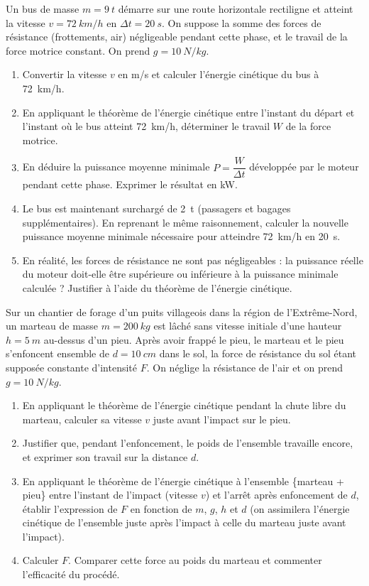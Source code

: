 \documentclass[11pt]{article}
\begin{document}
\begin{exercice}
Un bus de masse $m = \SI{9}{t}$ démarre sur une route horizontale rectiligne et atteint la vitesse $v = \SI{72}{km/h}$ en $\Delta t = \SI{20}{s}$. On suppose la somme des forces de résistance (frottements, air) négligeable pendant cette phase, et le travail de la force motrice constant. On prend $g = \SI{10}{N/kg}$.
\begin{enumerate}
\item Convertir la vitesse $v$ en m/s et calculer l'énergie cinétique du bus à \SI{72}{km/h}.
\item En appliquant le théorème de l'énergie cinétique entre l'instant du départ et l'instant où le bus atteint \SI{72}{km/h}, déterminer le travail $W$ de la force motrice.
\item En déduire la puissance moyenne minimale $P = \dfrac{W}{\Delta t}$ développée par le moteur pendant cette phase. Exprimer le résultat en kW.
\item Le bus est maintenant surchargé de \SI{2}{t} (passagers et bagages supplémentaires). En reprenant le même raisonnement, calculer la nouvelle puissance moyenne minimale nécessaire pour atteindre \SI{72}{km/h} en \SI{20}{s}.
\item En réalité, les forces de résistance ne sont pas négligeables : la puissance réelle du moteur doit-elle être supérieure ou inférieure à la puissance minimale calculée ? Justifier à l'aide du théorème de l'énergie cinétique.
\end{enumerate}
\end{exercice}

\begin{exercice}
Sur un chantier de forage d'un puits villageois dans la région de l'Extrême-Nord, un marteau de masse $m = \SI{200}{kg}$ est lâché sans vitesse initiale d'une hauteur $h = \SI{5}{m}$ au-dessus d'un pieu. Après avoir frappé le pieu, le marteau et le pieu s'enfoncent ensemble de $d = \SI{10}{cm}$ dans le sol, la force de résistance du sol étant supposée constante d'intensité $F$. On néglige la résistance de l'air et on prend $g = \SI{10}{N/kg}$.
\begin{enumerate}
\item En appliquant le théorème de l'énergie cinétique pendant la chute libre du marteau, calculer sa vitesse $v$ juste avant l'impact sur le pieu.
\item Justifier que, pendant l'enfoncement, le poids de l'ensemble travaille encore, et exprimer son travail sur la distance $d$.
\item En appliquant le théorème de l'énergie cinétique à l'ensemble \{marteau + pieu\} entre l'instant de l'impact (vitesse $v$) et l'arrêt après enfoncement de $d$, établir l'expression de $F$ en fonction de $m$, $g$, $h$ et $d$ (on assimilera l'énergie cinétique de l'ensemble juste après l'impact à celle du marteau juste avant l'impact).
\item Calculer $F$. Comparer cette force au poids du marteau et commenter l'efficacité du procédé.
\end{enumerate}
\end{exercice}
\end{document}
